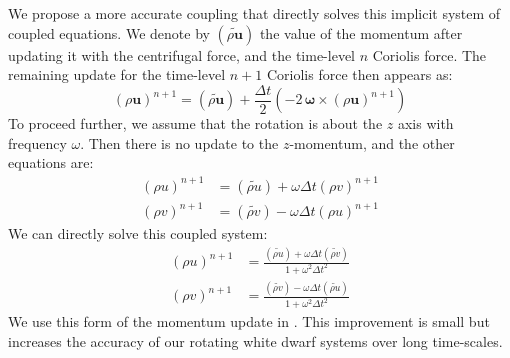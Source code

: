 \documentclass[12pt]{article}
\begin{document}
We propose a more accurate coupling that directly solves this implicit system of coupled
equations. We denote by $(\widetilde{\rho \mathbf{u}})$ the value of the momentum after
updating it with the centrifugal force, and the time-level $n$ Coriolis force. The remaining
update for the time-level $n+1$ Coriolis force then appears as:
\begin{equation}
  (\rho \mathbf{u})^{n+1} = (\widetilde{\rho\mathbf{u}}) + \frac{\Delta t}{2} \left(-2\, {\bm\omega} \times (\rho\mathbf{u})^{n+1}\right)
\end{equation}
To proceed further, we assume that the rotation is about the $z$ axis with frequency $\omega$.
Then there is no update to the $z$-momentum, and the other equations are:
\begin{align}
  (\rho u)^{n+1} &= (\widetilde{\rho u}) + \omega \Delta t (\rho v)^{n+1} \\
  (\rho v)^{n+1} &= (\widetilde{\rho v}) - \omega \Delta t (\rho u)^{n+1}
\end{align}
We can directly solve this coupled system:
\begin{align}
  (\rho u)^{n+1} &= \frac{ (\widetilde{\rho u}) + \omega \Delta t (\widetilde{\rho v})}{1 + \omega^2 \Delta t^2} \\
  (\rho v)^{n+1} &= \frac{ (\widetilde{\rho v}) - \omega \Delta t (\widetilde{\rho u})}{1 + \omega^2 \Delta t^2}
\end{align}
We use this form of the momentum update in \castro. This improvement is small
but increases the accuracy of our rotating white dwarf systems over long time-scales.
\end{document}
